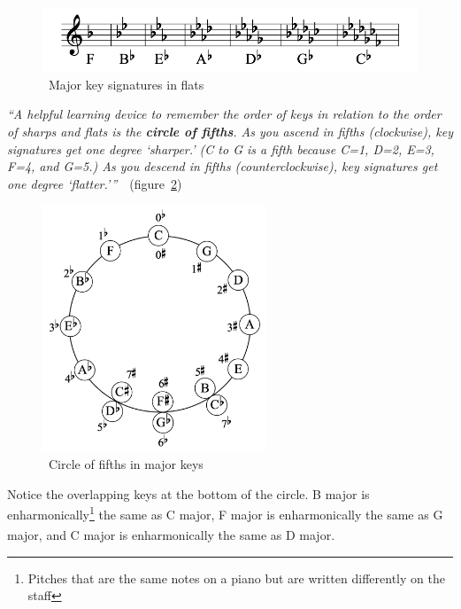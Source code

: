\begin{figure}
    \centering
    \includegraphics[width=\textwidth]{assets/major-signatures-flats}
    \caption{~Major key signatures in flats~\cite{music-theory}}\label{fig:major-signatures-flats}
\end{figure}

\textit{``A helpful learning device to remember the order of keys in relation to the order of sharps and flats is the \textbf{circle of fifths}.
As you ascend in fifths (clockwise), key signatures get one degree `sharper.'
    (C to G is a fifth because C=1, D=2, E=3, F=4, and G=5.)
    As you descend in fifths (counterclockwise), key signatures get one degree `flatter.'{''}}~\cite{music-theory}~(figure~\ref{fig:circle-of-fifths})


\begin{figure}
    \centering
    \includegraphics[width=0.6\textwidth]{assets/circle-of-fifths}
    \caption{~Circle of fifths in major keys~\cite{music-theory}}\label{fig:circle-of-fifths}
\end{figure}

Notice the overlapping keys at the bottom of the circle.
B major is enharmonically\footnote{Pitches that are the same notes on a piano but are written differently on the staff} the same as C\textsuperscript{\fl} major, F\textsuperscript{\sh} major is enharmonically the same as G\textsuperscript{\fl} major, and C\textsuperscript{\sh} major is enharmonically the same as D\textsuperscript{\fl} major.~\cite{music-theory}


